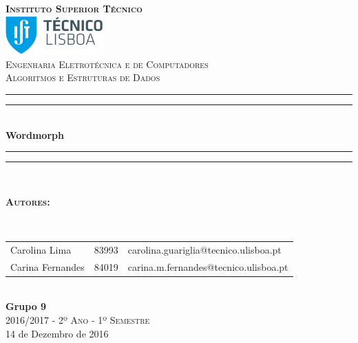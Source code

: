 \documentclass[18pt]{article}
\begin{document}
\begin{titlepage}

\thispagestyle{empty}
\newcommand{\HRule}{\rule{\linewidth}{0.5mm}} %
\center
\textsc{\bfseries\LARGE Instituto Superior Técnico}\\[1cm] %
\includegraphics[height=1.5cm]{IST_Logo.pdf}\\[2.5cm]
\textsc{\Large Engenharia Eletrotécnica e de Computadores}\\[0.5cm] %
\textsc{\large Algoritmos e Estruturas de Dados }\\[0.5cm] %

\rule{\textwidth}{1.6pt}\vspace*{-\baselineskip}\vspace*{2pt} %
\rule{\textwidth}{0.4pt}\\[\baselineskip] %

{\Huge \bfseries Wordmorph}\\[0.2cm]

\rule{\textwidth}{0.4pt}\vspace*{-\baselineskip}\vspace{3.2pt} %
\rule{\textwidth}{1.6pt}\\[1.5cm]


\begin{minipage}{0.9\textwidth}
	\begin{flushleft} \large
		\begin{Large}\bfseries\textsc{Autores:}\end{Large}\\[0.4cm]
		\begin{tabular}{l l l}

			Carolina Lima & 83993 & \normalsize carolina.guariglia@tecnico.ulisboa.pt \\
			Carina Fernandes & 84019 & \normalsize carina.m.fernandes@tecnico.ulisboa.pt\\

		\end{tabular}
	\end{flushleft}
\end{minipage}\\[0.5cm]


{\bfseries Grupo 9}\\[1cm]
\large\textsc{ 2016/2017 - 2º Ano - 1º Semestre}\\
\large 14 de Dezembro de 2016\\[1cm]


\end{titlepage}
\end{document}
